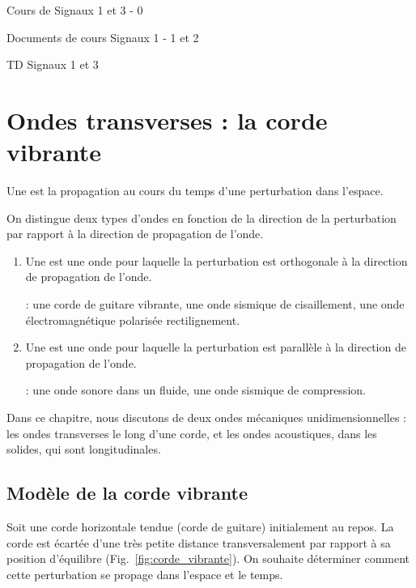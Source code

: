 \documentclass[12pt,fancy]{cours}
\begin{document}
{
\item Cours de Signaux 1 et 3 - 0
\item Documents de cours Signaux 1 - 1 et 2
\item TD Signaux 1 et 3
}

\section{Ondes transverses : la corde vibrante}
\begin{definition}[Onde]\label{def:}
  Une  est la propagation au cours du temps d'une perturbation dans l'espace.
\end{definition}
 On distingue deux types d'ondes en fonction de la direction de la perturbation par rapport à la direction de propagation de l'onde.
\begin{enumerate}
  \item Une  est une onde pour laquelle la perturbation est orthogonale à la direction de propagation de l'onde.
  
   : une corde de guitare vibrante, une onde sismique de cisaillement, une onde électromagnétique polarisée rectilignement.
  \item Une  est une onde pour laquelle la perturbation est parallèle à la direction de propagation de l'onde. 
  
   : une onde sonore dans un fluide, une onde sismique de compression.
\end{enumerate}
Dans ce chapitre, nous discutons de deux ondes mécaniques unidimensionnelles : les ondes transverses le long d'une corde, et les ondes acoustiques, dans les solides, qui sont longitudinales.
\label{sec:corde}
\subsection{Modèle de la corde vibrante}
Soit une corde horizontale tendue (corde de guitare) initialement au repos. La corde est écartée d’une très petite distance transversalement par rapport à sa position d'équilibre (Fig.~\ref{fig:corde_vibrante}). On souhaite déterminer comment cette perturbation se propage dans l’espace et le temps.
\end{document}
